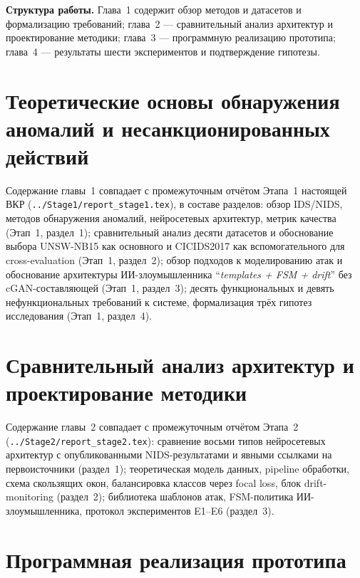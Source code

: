 \documentclass[14pt, a4paper]{extarticle}
\begin{document}
\textbf{Структура работы.} Глава~1 содержит обзор методов и датасетов и
формализацию требований; глава~2 --- сравнительный анализ архитектур и
проектирование методики; глава~3 --- программную реализацию прототипа;
глава~4 --- результаты шести экспериментов и подтверждение гипотезы.

\newpage

\section{Теоретические основы обнаружения аномалий и несанкционированных действий}
\label{ch:theory}

Содержание главы~1 совпадает с промежуточным отчётом Этапа~1 настоящей ВКР
(\verb|../Stage1/report_stage1.tex|), в составе разделов:
обзор IDS/NIDS, методов обнаружения аномалий, нейросетевых архитектур, метрик
качества (Этап~1, раздел~1); сравнительный анализ десяти датасетов и
обоснование выбора UNSW-NB15 как основного и CICIDS2017 как вспомогательного
для cross-evaluation (Этап~1, раздел~2); обзор подходов к моделированию
атак и обоснование архитектуры ИИ-злоумышленника
``\emph{templates + FSM + drift}'' без cGAN-составляющей (Этап~1,
раздел~3); десять функциональных и девять нефункциональных требований к
системе, формализация трёх гипотез исследования (Этап~1, раздел~4).

\section{Сравнительный анализ архитектур и проектирование методики}
\label{ch:design}

Содержание главы~2 совпадает с промежуточным отчётом Этапа~2
(\verb|../Stage2/report_stage2.tex|): сравнение восьми типов нейросетевых
архитектур с опубликованными NIDS-результатами и явными ссылками на
первоисточники (раздел~1); теоретическая модель данных, pipeline обработки,
схема скользящих окон, балансировка классов через focal loss, блок
drift-monitoring (раздел~2); библиотека шаблонов атак, FSM-политика
ИИ-злоумышленника, протокол экспериментов E1--E6
(раздел~3).

\section{Программная реализация прототипа}
\label{ch:impl}
\end{document}
